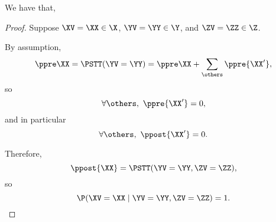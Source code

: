 \begin{proposition}
  We have that, %
\end{proposition}

\begin{proof}
  Suppose 
  $\XV = \XX \in \X$,
  $\YV = \YY \in \Y$, and
  $\ZV = \ZZ \in \Z$.

  By assumption,
  $$\ppre\XX = \PSTT(\YV = \YY) 
  = \ppre\XX + \sum_{\others}\ppre{\XX'},$$
    so
    $$\forall \others,\ \ppre{\XX'} = 0,$$
  and in particular
  $$\forall \others,\ \ppost{\XX'} = 0.$$

  Therefore, $$\ppost{\XX} = \PSTT(\YV = \YY, \ZV = \ZZ),$$
  so $$\P(\XV = \XX \mid \YV = \YY, \ZV = \ZZ) = 1.$$%
\end{proof}
